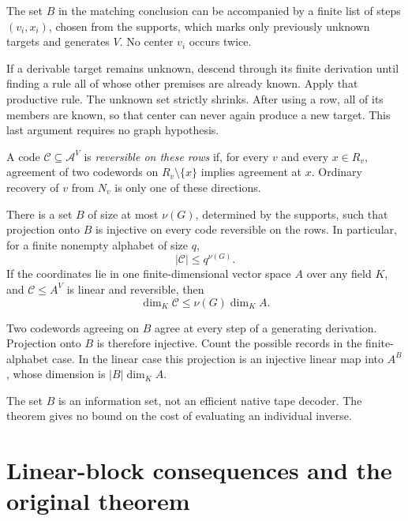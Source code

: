\begin{theorem}\label{thm:schedule}
The set $B$ in the matching conclusion can be accompanied by a finite list
of steps $(v_i,x_i)$, chosen from the supports, which marks only previously
unknown targets and generates $V$. No center $v_i$ occurs twice.
\end{theorem}
\begin{outline}
If a derivable target remains unknown, descend through its finite derivation
until finding a rule all of whose other premises are already known. Apply
that productive rule. The unknown set strictly shrinks. After using a row,
all of its members are known, so that center can never again produce a new
target. This last argument requires no graph hypothesis.
\end{outline}

A code $\mathcal C\subseteq\mathcal A^V$ is \emph{reversible on these rows}
if, for every $v$ and every $x\in R_v$, agreement of two codewords on
$R_v\setminus\{x\}$ implies agreement at $x$. Ordinary recovery of $v$
from $N_v$ is only one of these directions.

\begin{theorem}\label{thm:information}
There is a set $B$ of size at most $\nu(G)$, determined by the supports,
such that projection onto $B$ is injective on every code reversible on the
rows. In particular, for a finite nonempty alphabet of size $q$,
\[
 |\mathcal C|\le q^{\nu(G)}.
\]
If the coordinates lie in one finite-dimensional vector space $A$ over any
field $K$, and $\mathcal C\le A^V$ is linear and reversible, then
\[
 \dim_K\mathcal C\le\nu(G)\dim_K A.
\]
\end{theorem}
\begin{outline}
Two codewords agreeing on $B$ agree at every step of a generating derivation.
Projection onto $B$ is therefore injective. Count the possible records in
the finite-alphabet case. In the linear case this projection is an injective
linear map into $A^B$, whose dimension is $|B|\dim_K A$.
\end{outline}
The set $B$ is an information set, not an efficient native tape decoder.
The theorem gives no bound on the cost of evaluating an individual inverse.

\section{Linear-block consequences and the original theorem}\label{sec:blocks}

